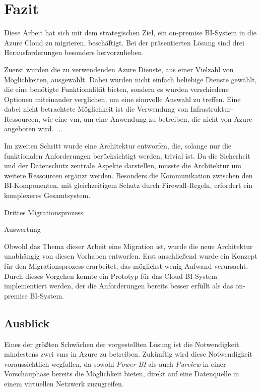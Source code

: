 \chapter{Fazit} \label{ch:zusammenfassung}
Diese Arbeit hat sich mit dem strategischen Ziel, ein on-premise BI-System in die Azure Cloud zu migrieren, beschäftigt. Bei der präsentierten Lösung sind drei Herausforderungen besonders hervorzuheben. 

Zuerst wurden die zu verwendenden Azure Dienste, aus einer Vielzahl von Möglichkeiten, ausgewählt. Dabei wurden nicht einfach beliebige Dienste gewählt, die eine benötigte Funktionalität bieten, sondern es wurden verschiedene Optionen miteinander verglichen, um eine sinnvolle Auswahl zu treffen. Eine dabei nicht betrachtete Möglichkeit ist die Verwendung von Infrastruktur-Ressourcen, wie eine \ac{vm}, um eine Anwendung zu betreiben, die nicht von Azure angeboten wird.  \textit{...}

Im zweiten Schritt wurde eine Architektur entworfen, die, solange nur die funktionalen Anforderungen berücksichtigt werden, trivial ist. Da die Sicherheit und der Datenschutz zentrale Aspekte darstellen, musste die Architektur um weitere Ressourcen ergänzt werden. Besonders die Kommunikation zwischen den BI-Komponenten, mit gleichzeitigem Schutz durch Firewall-Regeln, erfordert ein komplexeres Gesamtsystem.

Drittes Migrationsprozess

Auswertung

Obwohl das Thema dieser Arbeit eine Migration ist, wurde die neue Architektur unabhängig von diesen Vorhaben entworfen. Erst anschließend wurde ein Konzept für den Migrationsprozess erarbeitet, das möglichst wenig Aufwand verursacht. Durch dieses Vorgehen konnte ein Prototyp für das Cloud-BI-System implementiert werden, der die Anforderungen bereits besser erfüllt als das on-premise BI-System.

\section{Ausblick}
Eines der größten Schwächen der vorgestellten Lösung ist die Notwendigkeit mindestens zwei \acp{vm} in Azure zu betreiben. Zukünftig wird diese Notwendigkeit voraussichtlich wegfallen, da sowohl \textit{Power BI} als auch \textit{Purview} in einer Vorschauphase bereits die Möglichkeit bieten, direkt auf eine Datenquelle in einem virtuellen Netzwerk zuzugreifen.